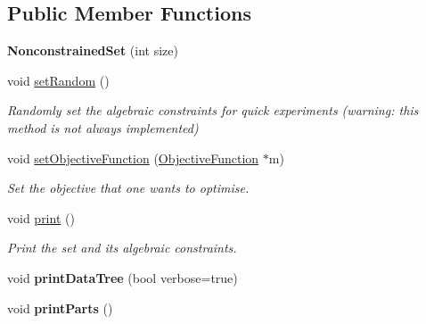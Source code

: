 \subsection*{Public Member Functions}
\begin{DoxyCompactItemize}
\item 
\hypertarget{classNonconstrainedSet_a796dd2d6fdf3df03c3b1c3ddacd3c97b}{{\bfseries Nonconstrained\-Set} (int size)}\label{classNonconstrainedSet_a796dd2d6fdf3df03c3b1c3ddacd3c97b}

\item 
\hypertarget{classNonconstrainedSet_a71c6b8dfd1b2abbed3c712464c6c2538}{void \hyperlink{classNonconstrainedSet_a71c6b8dfd1b2abbed3c712464c6c2538}{set\-Random} ()}\label{classNonconstrainedSet_a71c6b8dfd1b2abbed3c712464c6c2538}

\begin{DoxyCompactList}\small\item\em Randomly set the algebraic constraints for quick experiments (warning\-: this method is not always implemented) \end{DoxyCompactList}\item 
void \hyperlink{classNonconstrainedSet_a2d2b1ff5390c9c8bfa7e6e361ea1ddb1}{set\-Objective\-Function} (\hyperlink{classObjectiveFunction}{Objective\-Function} $\ast$m)
\begin{DoxyCompactList}\small\item\em Set the objective that one wants to optimise. \end{DoxyCompactList}\item 
\hypertarget{classNonconstrainedSet_a7d08b45f9f37f5285fee36fb98aa58af}{void \hyperlink{classNonconstrainedSet_a7d08b45f9f37f5285fee36fb98aa58af}{print} ()}\label{classNonconstrainedSet_a7d08b45f9f37f5285fee36fb98aa58af}

\begin{DoxyCompactList}\small\item\em Print the set and its algebraic constraints. \end{DoxyCompactList}\item 
\hypertarget{classNonconstrainedSet_aca7f44d0e83746d9db1fecbfd44551f5}{void {\bfseries print\-Data\-Tree} (bool verbose=true)}\label{classNonconstrainedSet_aca7f44d0e83746d9db1fecbfd44551f5}

\item 
\hypertarget{classNonconstrainedSet_aef678b21e8d249236aa0fd601599eee7}{void {\bfseries print\-Parts} ()}\label{classNonconstrainedSet_aef678b21e8d249236aa0fd601599eee7}


\end{DoxyCompactItemize}
